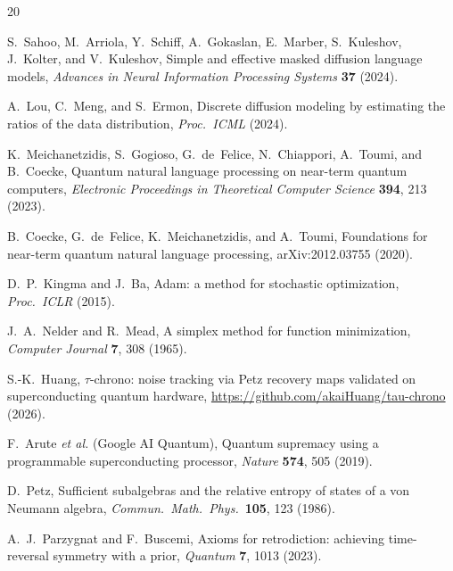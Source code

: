 \documentclass[prl,twocolumn,superscriptaddress,longbibliography,floatfix]{revtex4-2}
\begin{document}
\begin{thebibliography}{20}

S.~Sahoo, M.~Arriola, Y.~Schiff, A.~Gokaslan, E.~Marber, S.~Kuleshov, J.~Kolter, and V.~Kuleshov,
Simple and effective masked diffusion language models,
\emph{Advances in Neural Information Processing Systems} \textbf{37} (2024).

A.~Lou, C.~Meng, and S.~Ermon,
Discrete diffusion modeling by estimating the ratios of the data distribution,
\emph{Proc.\ ICML} (2024).

K.~Meichanetzidis, S.~Gogioso, G.~de~Felice, N.~Chiappori, A.~Toumi, and B.~Coecke,
Quantum natural language processing on near-term quantum computers,
\emph{Electronic Proceedings in Theoretical Computer Science} \textbf{394}, 213 (2023).

B.~Coecke, G.~de~Felice, K.~Meichanetzidis, and A.~Toumi,
Foundations for near-term quantum natural language processing,
arXiv:2012.03755 (2020).

D.~P.~Kingma and J.~Ba,
Adam: a method for stochastic optimization,
\emph{Proc.\ ICLR} (2015).

J.~A.~Nelder and R.~Mead,
A simplex method for function minimization,
\emph{Computer Journal} \textbf{7}, 308 (1965).

S.-K.~Huang,
$\tau$-chrono: noise tracking via Petz recovery maps validated on superconducting quantum hardware,
\url{https://github.com/akaiHuang/tau-chrono} (2026).

F.~Arute \emph{et al.} (Google AI Quantum),
Quantum supremacy using a programmable superconducting processor,
\emph{Nature} \textbf{574}, 505 (2019).

D.~Petz,
Sufficient subalgebras and the relative entropy of states of a von Neumann algebra,
\emph{Commun.\ Math.\ Phys.}\ \textbf{105}, 123 (1986).

A.~J.~Parzygnat and F.~Buscemi,
Axioms for retrodiction: achieving time-reversal symmetry with a prior,
\emph{Quantum} \textbf{7}, 1013 (2023).

\end{thebibliography}
\end{document}
